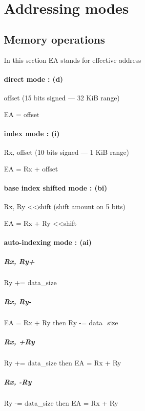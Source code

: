\documentclass[11pt]{article}
\begin{document}
\newpage
\section{Addressing modes}

\subsection{Memory operations}
In this section EA stands for effective address

\paragraph{direct mode : (d)}

offset (15 bits signed --- 32 KiB range)

EA = offset

\paragraph{index mode : (i)}

Rx, offset (10 bits signed --- 1 KiB range)

EA = Rx + offset

\paragraph{base index shifted mode : (bi) }

Rx, Ry \textless\textless shift (shift amount on 5 bits)

EA = Rx + Ry \textless\textless shift

\paragraph{auto-indexing mode : (ai) }

\subparagraph{Rx, Ry+}

Ry += data\_size

\subparagraph{Rx, Ry-}

EA = Rx + Ry then Ry -= data\_size

\subparagraph{Rx, +Ry}

Ry += data\_size then EA = Rx + Ry

\subparagraph{Rx, -Ry}

Ry -= data\_size then EA = Rx + Ry
\end{document}
